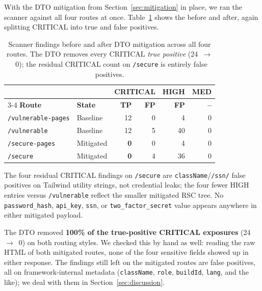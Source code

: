 \documentclass[runningheads]{llncs}
\begin{document}
With the DTO mitigation from Section~\ref{sec:mitigation} in place, we ran
the scanner against all four routes at once.
Table~\ref{tab:results_comparison} shows the before and after, again
splitting CRITICAL into true and false positives.

\begin{table}[tbp]
  \caption{Scanner findings before and after DTO mitigation across all
    four routes.  The DTO removes every CRITICAL \emph{true positive}
    (24~$\rightarrow$~0); the residual CRITICAL count on \texttt{/secure}
    is entirely false positives.}
  \label{tab:results_comparison}
  \centering
  \begin{tabular}{llrrrr}
    \toprule
    & & \multicolumn{2}{c}{\textbf{CRITICAL}} & \textbf{HIGH} & \textbf{MED} \\
    \cmidrule(lr){3-4}
    \textbf{Route} & \textbf{State} & \textbf{TP} & \textbf{FP} & \textbf{FP} & \textbf{--} \\
    \midrule
    \texttt{/vulnerable-pages} & Baseline   & 12 & 0 & 4  & 0 \\
    \texttt{/vulnerable}       & Baseline   & 12 & 5 & 40 & 0 \\
    \texttt{/secure-pages}     & Mitigated  & \textbf{0} & 0 & 4  & 0 \\
    \texttt{/secure}           & Mitigated  & \textbf{0} & 4 & 36 & 0 \\
    \bottomrule
  \end{tabular}

  \smallskip
  \footnotesize{The four residual CRITICAL findings on \texttt{/secure} are
    \texttt{className}/\texttt{/ssn/} false positives on Tailwind utility
    strings, not credential leaks; the four fewer HIGH entries versus
    \texttt{/vulnerable} reflect the smaller mitigated RSC tree.  No
    \texttt{password\_hash}, \texttt{api\_key}, \texttt{ssn}, or
    \texttt{two\_factor\_secret} value appears anywhere in either mitigated
    payload.}
\end{table}

The DTO removed \textbf{100\% of the true-positive CRITICAL exposures}
(24~$\rightarrow$~0) on both routing styles.  We checked this by hand as
well: reading the raw HTML of both mitigated routes, none of the four
sensitive fields showed up in either response.  The findings still left on
the mitigated routes are false positives, all on framework-internal
metadata (\texttt{className}, \texttt{role}, \texttt{buildId},
\texttt{lang}, and the like); we deal with them in
Section~\ref{sec:discussion}.
\end{document}

